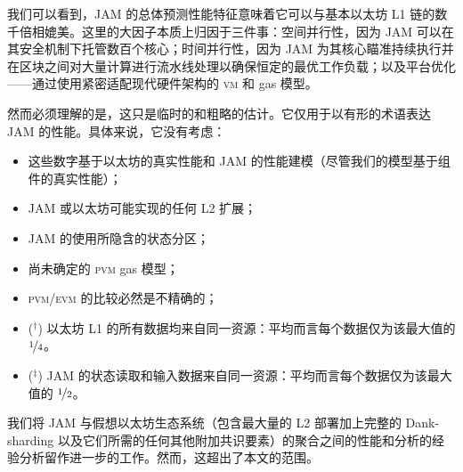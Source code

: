我们可以看到，JAM 的总体预测性能特征意味着它可以与基本以太坊 L1 链的数千倍相媲美。这里的大因子本质上归因于三件事：空间并行性，因为 JAM 可以在其安全机制下托管数百个核心；时间并行性，因为 JAM 为其核心瞄准持续执行并在区块之间对大量计算进行流水线处理以确保恒定的最优工作负载；以及平台优化——通过使用紧密适配现代硬件架构的 \textsc{vm} 和 gas 模型。

然而必须理解的是，这只是临时的和粗略的估计。它仅用于以有形的术语表达 JAM 的性能。具体来说，它没有考虑：
\begin{itemize}
  \item 这些数字基于以太坊的真实性能和 JAM 的性能建模（尽管我们的模型基于组件的真实性能）；
  \item JAM 或以太坊可能实现的任何 L2 扩展；
  \item JAM 的使用所隐含的状态分区；
  \item 尚未确定的 \textsc{pvm} gas 模型；
  \item \textsc{pvm}/\textsc{evm} 的比较必然是不精确的；
  \item (${}^\dagger$) 以太坊 L1 的所有数据均来自同一资源：平均而言每个数据仅为该最大值的 $\nicefrac{1}{4}$。
  \item (${}^\ddagger$) JAM 的状态读取和输入数据来自同一资源：平均而言每个数据仅为该最大值的 $\nicefrac{1}{2}$。
\end{itemize}

我们将 JAM 与假想以太坊生态系统（包含最大量的 L2 部署加上完整的 Dank-sharding 以及它们所需的任何其他附加共识要素）的聚合之间的性能和分析的经验分析留作进一步的工作。然而，这超出了本文的范围。

